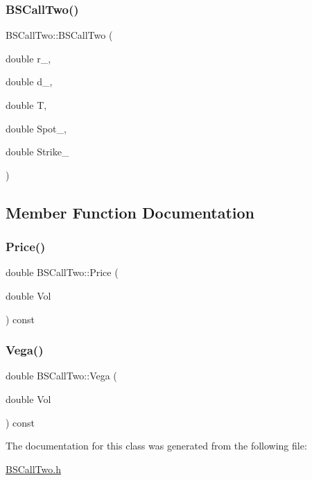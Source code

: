 \subsubsection{\texorpdfstring{B\+S\+Call\+Two()}{BSCallTwo()}}
{\footnotesize\ttfamily B\+S\+Call\+Two\+::\+B\+S\+Call\+Two (\begin{DoxyParamCaption}\item[{double}]{r\+\_\+,  }\item[{double}]{d\+\_\+,  }\item[{double}]{T,  }\item[{double}]{Spot\+\_\+,  }\item[{double}]{Strike\+\_\+ }\end{DoxyParamCaption})}



\subsection{Member Function Documentation}
\hypertarget{classBSCallTwo_a665a1b79a859410d1b588c0811f4143a}{}\label{classBSCallTwo_a665a1b79a859410d1b588c0811f4143a} 
\subsubsection{\texorpdfstring{Price()}{Price()}}
{\footnotesize\ttfamily double B\+S\+Call\+Two\+::\+Price (\begin{DoxyParamCaption}\item[{double}]{Vol }\end{DoxyParamCaption}) const}

\hypertarget{classBSCallTwo_ab98dc7e0e5218cfc47aac07c700539fa}{}\label{classBSCallTwo_ab98dc7e0e5218cfc47aac07c700539fa} 
\subsubsection{\texorpdfstring{Vega()}{Vega()}}
{\footnotesize\ttfamily double B\+S\+Call\+Two\+::\+Vega (\begin{DoxyParamCaption}\item[{double}]{Vol }\end{DoxyParamCaption}) const}



The documentation for this class was generated from the following file\+:\begin{DoxyCompactItemize}
\item 
\hyperlink{BSCallTwo_8h}{B\+S\+Call\+Two.\+h}\end{DoxyCompactItemize}
